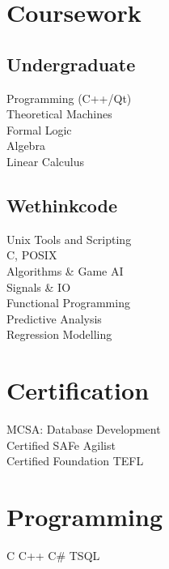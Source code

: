 \documentclass[]{deedy-resume-openfont}
\begin{document}
\begin{minipage}[t]{0.33\textwidth}

\section{Coursework}
\subsection{Undergraduate}
Programming (C++/Qt) \\
Theoretical Machines \\
Formal Logic \\
Algebra \\
Linear Calculus \\
\sectionsep

\subsection{Wethinkcode}
Unix Tools and Scripting \\
C, POSIX \\
Algorithms \& Game AI\\
Signals \& IO\\
Functional Programming \\
Predictive Analysis \\
Regression Modelling \\


\section{Certification}
MCSA: Database Development \\
Certified SAFe \textregistered Agilist \\
Certified Foundation TEFL
\sectionsep


\section{Programming}
C \textbullet{} C++ \textbullet{} C\# \textbullet{}  TSQL \\


\end{minipage}
\end{document}
